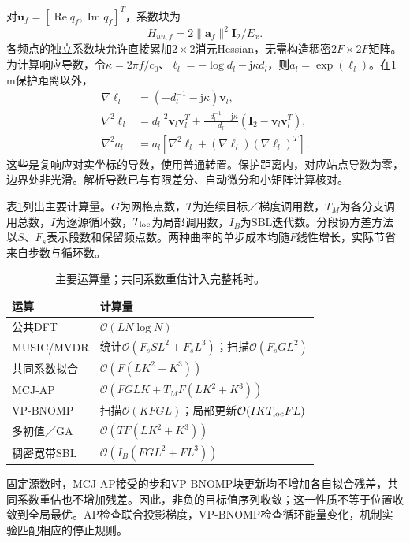 \documentclass[a4paper,fleqn]{cas-sc}
\newcommand{\Rea}{\operatorname{Re}}
\begin{document}
对$\bm u_f=[\Rea q_f,\operatorname{Im}q_f]^T$，系数块为
\begin{equation}
H_{uu,f}=2\|\bm a_f\|^2\bm I_2/E_x.
\end{equation}
各频点的独立系数块允许直接累加$2\times2$消元Hessian，无需构造稠密$2F\times2F$矩阵。为计算响应导数，令$\kappa=2\pi f/c_0$、$\ell_l=-\log d_l-\mathrm j\kappa d_l$，则$a_l=\exp(\ell_l)$。在1\,m保护距离以外，
\begin{align}
\nabla\ell_l&=(-d_l^{-1}-\mathrm j\kappa)\bm v_l,\\
\nabla^2\ell_l&=d_l^{-2}\bm v_l\bm v_l^T+
\frac{-d_l^{-1}-\mathrm j\kappa}{d_l}(\bm I_2-\bm v_l\bm v_l^T),\\
\nabla^2a_l&=a_l[\nabla^2\ell_l+(\nabla\ell_l)(\nabla\ell_l)^T].
\label{en:responseHessian}
\end{align}
这些是复响应对实坐标的导数，使用普通转置。保护距离内，对应站点导数为零，边界处非光滑。解析导数已与有限差分、自动微分和小矩阵计算核对。

表\ref{en:complexity}列出主要计算量。$G$为网格点数，$T$为连续目标／梯度调用数，$T_M$为各分支调用总数，$I$为逐源循环数，$T_{\rm loc}$为局部调用数，$I_B$为SBL迭代数。分段协方差方法以$S$、$F_s$表示段数和保留频点数。两种曲率的单步成本均随$F$线性增长，实际节省来自步数与循环数。
\begin{table}[pos=H]\centering
\caption{主要运算量；共同系数重估计入完整耗时。}\label{en:complexity}
\begin{tabularx}{\linewidth}{@{}lX@{}}\toprule
运算 & 计算量\\\midrule
公共DFT & $\mathcal O(LN\log N)$\\
MUSIC/MVDR & 统计$\mathcal O(F_sSL^2+F_sL^3)$；扫描$\mathcal O(F_sGL^2)$\\
共同系数拟合 & $\mathcal O(F(LK^2+K^3))$\\
MCJ-AP & $\mathcal O(FGLK+T_MF(LK^2+K^3))$\\
VP-BNOMP & 扫描$\mathcal O(KFGL)$；局部更新$\mathcal O(IKT_{\rm loc}FL)$\\
多初值／GA & $\mathcal O(TF(LK^2+K^3))$\\
稠密宽带SBL & $\mathcal O(I_B(FGL^2+FL^3))$\\\bottomrule
\end{tabularx}\end{table}

固定源数时，MCJ-AP接受的步和VP-BNOMP块更新均不增加各自拟合残差，共同系数重估也不增加残差。因此，非负的目标值序列收敛；这一性质不等于位置收敛到全局最优。AP检查联合投影梯度，VP-BNOMP检查循环能量变化，机制实验匹配相应的停止规则。
\end{document}
